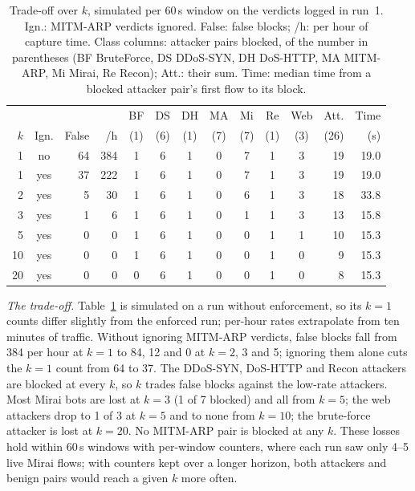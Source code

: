\begin{table}[t]
\centering
\caption{Trade-off over $k$, simulated per 60\,s window on the verdicts logged in run~1. Ign.: MITM-ARP verdicts ignored. False: false blocks; /h: per hour of capture time. Class columns: attacker pairs blocked, of the number in parentheses (BF BruteForce, DS DDoS-SYN, DH DoS-HTTP, MA MITM-ARP, Mi Mirai, Re Recon); Att.: their sum. Time: median time from a blocked attacker pair's first flow to its block.}
\label{tab:kcurve}
\footnotesize
\setlength{\tabcolsep}{2.4pt}
\begin{tabular}{rcrrcccccccrr}
\hline
 & & & & BF & DS & DH & MA & Mi & Re & Web & Att. & Time \\
$k$ & Ign. & False & /h & (1) & (6) & (1) & (7) & (7) & (1) & (3) & (26) & (s) \\
\hline
1  & no  & 64 & 384 & 1 & 6 & 1 & 0 & 7 & 1 & 3 & 19 & 19.0 \\
1  & yes & 37 & 222 & 1 & 6 & 1 & 0 & 7 & 1 & 3 & 19 & 19.0 \\
2  & yes &  5 &  30 & 1 & 6 & 1 & 0 & 6 & 1 & 3 & 18 & 33.8 \\
3  & yes &  1 &   6 & 1 & 6 & 1 & 0 & 1 & 1 & 3 & 13 & 15.8 \\
5  & yes &  0 &   0 & 1 & 6 & 1 & 0 & 0 & 1 & 1 & 10 & 15.3 \\
10 & yes &  0 &   0 & 1 & 6 & 1 & 0 & 0 & 1 & 0 &  9 & 15.3 \\
20 & yes &  0 &   0 & 0 & 6 & 1 & 0 & 0 & 1 & 0 &  8 & 15.3 \\
\hline
\end{tabular}
\end{table}

\emph{The trade-off.} Table~\ref{tab:kcurve} is simulated on a run without enforcement, so its $k=1$ counts differ slightly from the enforced run; per-hour rates extrapolate from ten minutes of traffic. Without ignoring MITM-ARP verdicts, false blocks fall from 384 per hour at $k=1$ to 84, 12 and 0 at $k=2$, 3 and 5; ignoring them alone cuts the $k=1$ count from 64 to 37. The DDoS-SYN, DoS-HTTP and Recon attackers are blocked at every $k$, so $k$ trades false blocks against the low-rate attackers. Most Mirai bots are lost at $k=3$ (1 of 7 blocked) and all from $k=5$; the web attackers drop to 1 of 3 at $k=5$ and to none from $k=10$; the brute-force attacker is lost at $k=20$. No MITM-ARP pair is blocked at any $k$. These losses hold within 60\,s windows with per-window counters, where each run saw only 4--5 live Mirai flows; with counters kept over a longer horizon, both attackers and benign pairs would reach a given $k$ more often.

